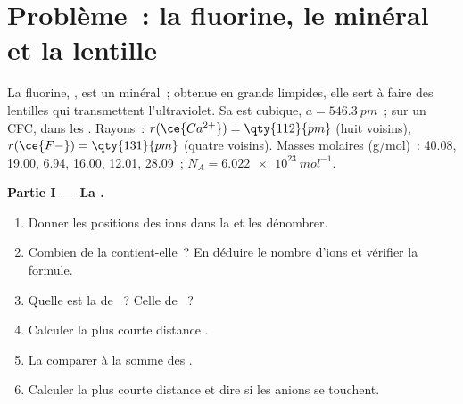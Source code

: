 \section{Problème~: la fluorine, le minéral et la lentille}

\begin{problem}
\label{pb:b1:crystals-ionic-covalent:1}
La fluorine, , est un minéral~; obtenue en grands 
limpides, elle sert à faire des lentilles qui transmettent
l'ultraviolet. Sa  est cubique, $a =
\qty{546.3}{pm}$~;  sur un  CFC,  dans les . Rayons~: $r(\ce{Ca^{2+}}) = \qty{112}{pm}$ (huit
voisins), $r(\ce{F-}) = \qty{131}{pm}$ (quatre voisins). Masses molaires
(g/mol)~:  40.08,  19.00,  6.94,  16.00,
 12.01,  28.09~; $N_A = \qty{6.022e23}{mol^{-1}}$.

\medskip
\noindent\textbf{Partie I --- La .}
\begin{enumerate}
  \item Donner les positions des ions  dans la  et les
        dénombrer.
  \item Combien de  la  contient-elle~? En
        déduire le nombre d'ions  et vérifier la formule.
  \item Quelle est la  de ~? Celle de ~?
  \item Calculer la plus courte distance .
  \item La comparer à la somme des .
  \item Calculer la plus courte distance  et dire si les anions
        se touchent.
\end{enumerate}


\end{problem}
